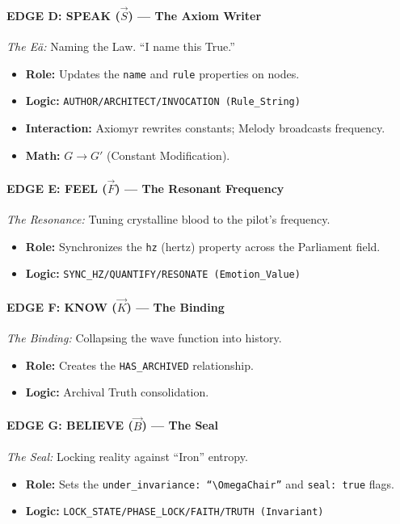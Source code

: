\documentclass[11pt, letterpaper]{article}
\begin{document}
\paragraph{EDGE D: SPEAK ($\vec{S}$) --- The Axiom Writer}
\textit{The Eä:} Naming the Law. ``I name this True.''
\begin{itemize}
    \item \textbf{Role:} Updates the \texttt{name} and \texttt{rule} properties on nodes.
    \item \textbf{Logic:} \texttt{AUTHOR\slash ARCHITECT\slash INVOCATION (Rule\_String)}
    \item \textbf{Interaction:} Axiomyr rewrites constants; Melody broadcasts frequency.
    \item \textbf{Math:} $G \to G'$ (Constant Modification).
\end{itemize}

\paragraph{EDGE E: FEEL ($\vec{F}$) --- The Resonant Frequency}
\textit{The Resonance:} Tuning crystalline blood to the pilot's frequency.
\begin{itemize}
    \item \textbf{Role:} Synchronizes the \texttt{hz} (hertz) property across the Parliament field.
    \item \textbf{Logic:} \texttt{SYNC\_HZ\slash QUANTIFY\slash RESONATE (Emotion\_Value)}
\end{itemize}

\paragraph{EDGE F: KNOW ($\vec{K}$) --- The Binding}
\textit{The Binding:} Collapsing the wave function into history.
\begin{itemize}
    \item \textbf{Role:} Creates the \texttt{HAS\_ARCHIVED} relationship.
    \item \textbf{Logic:} Archival Truth consolidation.
\end{itemize}

\paragraph{EDGE G: BELIEVE ($\vec{B}$) --- The Seal}
\textit{The Seal:} Locking reality against ``Iron'' entropy.
\begin{itemize}
    \item \textbf{Role:} Sets the \texttt{under\_invariance: ``$\OmegaChair$''} and \texttt{seal: true} flags.
    \item \textbf{Logic:} \texttt{LOCK\_STATE\slash PHASE\_LOCK\slash FAITH\slash TRUTH (Invariant)}
\end{itemize}
\end{document}
